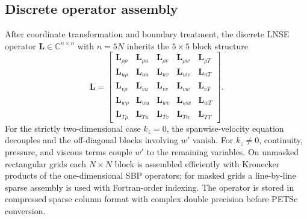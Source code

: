 \documentclass[11pt]{article}
\newcommand{\bL}{\mathbf{L}}
\begin{document}
\subsection{Discrete operator assembly}
\label{sec:assembly}

After coordinate transformation and boundary treatment, the discrete LNSE
operator $\bL \in \mathbb{C}^{n\times n}$ with $n = 5N$ inherits the
$5\times5$ block structure
\begin{equation}
  \bL =
  \begin{bmatrix}
    \bL_{\rho\rho} & \bL_{\rho u} & \bL_{\rho v} & \bL_{\rho w} & \bL_{\rho T}\\
    \bL_{u\rho} & \bL_{uu} & \bL_{uv} & \bL_{uw} & \bL_{uT}\\
    \bL_{v\rho} & \bL_{vu} & \bL_{vv} & \bL_{vw} & \bL_{vT}\\
    \bL_{w\rho} & \bL_{wu} & \bL_{wv} & \bL_{ww} & \bL_{wT}\\
    \bL_{T\rho} & \bL_{Tu} & \bL_{Tv} & \bL_{Tw} & \bL_{TT}
  \end{bmatrix}.
  \label{eq:block_L}
\end{equation}
For the strictly two-dimensional case $k_z = 0$, the spanwise-velocity
equation decouples and the off-diagonal blocks involving $w'$ vanish. For
$k_z \neq 0$, continuity, pressure, and viscous terms couple $w'$ to the
remaining variables. On unmasked rectangular grids each $N\times N$ block is
assembled efficiently with Kronecker products of the one-dimensional SBP
operators; for masked grids a line-by-line sparse assembly is used with
Fortran-order indexing. The operator is stored in compressed sparse column
format with complex double precision before PETSc conversion.
\end{document}
